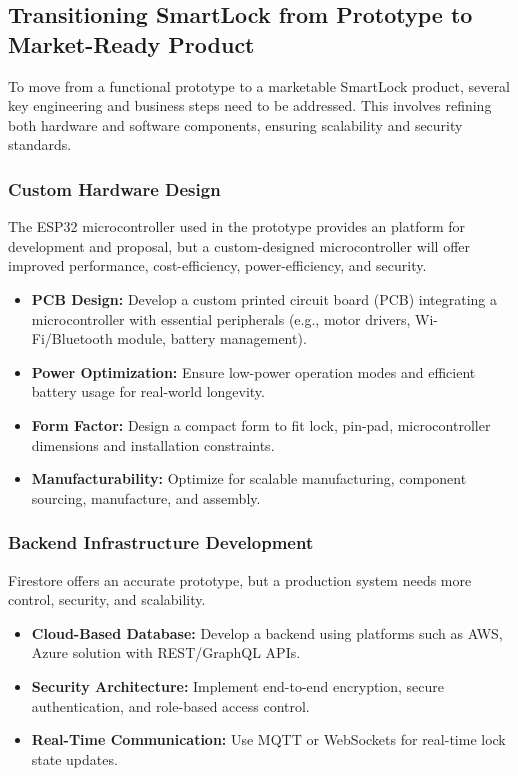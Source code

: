 \newpage
\subsection{Transitioning SmartLock from Prototype to Market-Ready Product}

To move from a functional prototype to a marketable SmartLock product, several key engineering and business steps need to be addressed. This involves refining both hardware and software components, ensuring scalability and security standards.

\subsubsection{Custom Hardware Design}

The ESP32 microcontroller used in the prototype provides an platform for development and proposal, but a custom-designed microcontroller will offer improved performance, cost-efficiency, power-efficiency, and security.

\begin{itemize}
  \item \textbf{PCB Design:} Develop a custom printed circuit board (PCB) integrating a microcontroller with essential peripherals (e.g., motor drivers, Wi-Fi/Bluetooth module, battery management).
  \item \textbf{Power Optimization:} Ensure low-power operation modes and efficient battery usage for real-world longevity.
  \item \textbf{Form Factor:} Design a compact form to fit lock, pin-pad, microcontroller dimensions and installation constraints.
  \item \textbf{Manufacturability:} Optimize for scalable manufacturing, component sourcing, manufacture, and assembly.
\end{itemize}

\subsubsection{Backend Infrastructure Development}

Firestore offers an accurate prototype, but a production system needs more control, security, and scalability.

\begin{itemize}
  \item \textbf{Cloud-Based Database:} Develop a backend using platforms such as AWS, Azure solution with REST/GraphQL APIs.
  \item \textbf{Security Architecture:} Implement end-to-end encryption, secure authentication, and role-based access control.
  \item \textbf{Real-Time Communication:} Use MQTT or WebSockets for real-time lock state updates.
\end{itemize}

